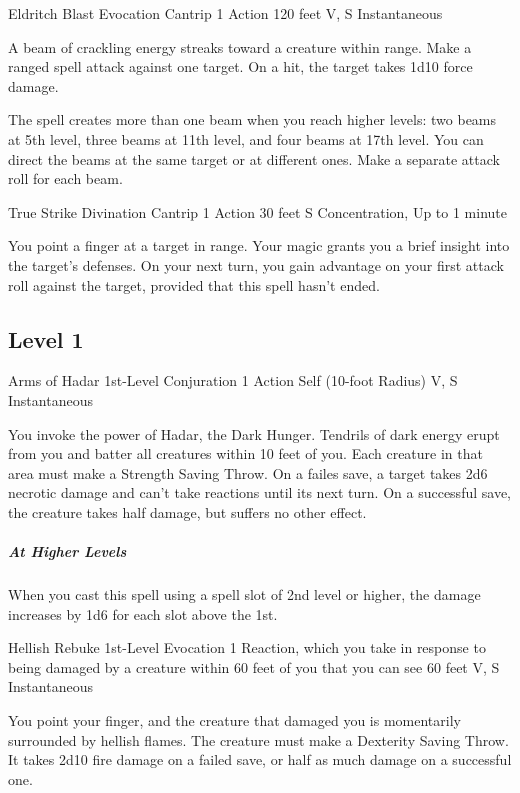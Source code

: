 \documentclass[letterpaper,openany,oneside,twocolumn]{book}
\begin{document}
\DndSpellHeader
  {Eldritch Blast}
  {Evocation Cantrip}
  {1 Action}
  {120 feet}
  {V, S}
  {Instantaneous}

A beam of crackling energy streaks toward a creature within range. Make a ranged spell attack against one target. On a hit, the target takes 1d10 force damage.

The spell creates more than one beam when you reach higher levels: two beams at 5th level, three beams at 11th level, and four beams at 17th level. You can direct the beams at the same target or at different ones. Make a separate attack roll for each beam.

\DndSpellHeader
  {True Strike}
  {Divination Cantrip}
  {1 Action}
  {30 feet}
  {S}
  {Concentration, Up to 1 minute}

You point a finger at a target in range. Your magic grants you a brief insight into the target's defenses. On your next turn, you gain advantage on your first attack roll against the target, provided that this spell hasn't ended.

\subsection*{Level 1}

\DndSpellHeader
  {Arms of Hadar}
  {1st-Level Conjuration}
  {1 Action}
  {Self (10-foot Radius)}
  {V, S}
  {Instantaneous}

You invoke the power of Hadar, the Dark Hunger. Tendrils of dark energy erupt from you and batter all creatures within 10 feet of you. Each creature in that area must make a Strength Saving Throw. On a failes save, a target takes 2d6 necrotic damage and can't take reactions until its next turn. On a successful save, the creature takes half damage, but suffers no other effect.

\subparagraph*{At Higher Levels} When you cast this spell using a spell slot of 2nd level or higher, the damage increases by 1d6 for each slot above the 1st.

\DndSpellHeader
  {Hellish Rebuke}
  {1st-Level Evocation}
  {1 Reaction, which you take in response to being damaged by a creature within 60 feet of you that you can see}
  {60 feet}
  {V, S}
  {Instantaneous}

You point your finger, and the creature that damaged you is momentarily surrounded by hellish flames. The creature must make a Dexterity Saving Throw. It takes 2d10 fire damage on a failed save, or half as much damage on a successful one.
\end{document}
